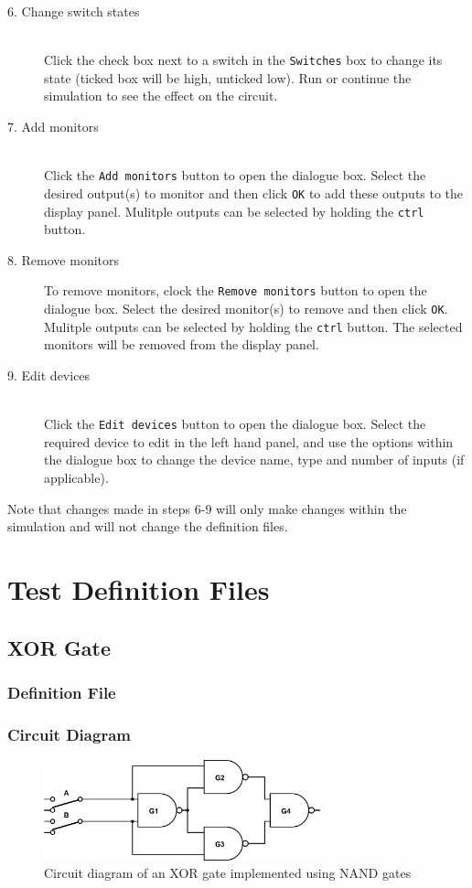 \documentclass[a4paper,10pt]{article}
\begin{document}
\begin{description}
\item[6. Change switch states]\hfill \\
Click the check box next to a switch in the \texttt{Switches} box to change its state (ticked box will be high, unticked low). Run or continue the simulation to see the effect on the circuit.
\item[7. Add monitors]\hfill \\
Click the \texttt{Add monitors} button to open the dialogue box. Select the desired output(s) to monitor and then click \texttt{OK} to add these outputs to the display panel. Mulitple outputs can be selected by holding the \texttt{ctrl} button.
\item[8. Remove monitors]
To remove monitors, clock the \texttt{Remove monitors} button to open the dialogue box. Select the desired monitor(s) to remove and then click \texttt{OK}. Mulitple outputs can be selected by holding the \texttt{ctrl} button. The selected monitors will be removed from the display panel.
\item[9. Edit devices]\hfill \\
Click the \texttt{Edit devices} button to open the dialogue box. Select the required device to edit in the left hand panel, and use the options within the dialogue box to change the device name, type and number of inputs (if applicable).
\end{description}

Note that changes made in steps 6-9 will only make changes within the simulation and will not change the definition files.

\pagebreak

\section{Test Definition Files}

\subsection{XOR Gate}
\subsubsection{Definition File}

\subsubsection{Circuit Diagram}
\begin{figure}[h]
 \centering
 \includegraphics[width=8cm]{../../examples/xor.png}
 \caption{Circuit diagram of an XOR gate implemented using NAND gates}
 \label{fig:example-xor}
\end{figure}
\end{document}
